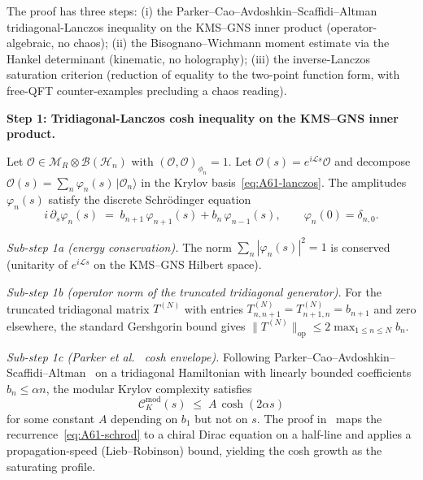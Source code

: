 \documentclass[12pt,a4paper]{article}
\begin{document}
The proof has three steps: (i) the Parker--Cao--Avdoshkin--Scaffidi--Altman
tridiagonal-Lanczos inequality on the KMS--GNS inner product (operator-algebraic,
no chaos); (ii) the Bisognano--Wichmann moment estimate via the Hankel
determinant (kinematic, no holography); (iii) the inverse-Lanczos
saturation criterion (reduction of equality to the two-point function form,
with free-QFT counter-examples precluding a chaos reading).

\medskip

\noindent\textbf{Step 1: Tridiagonal-Lanczos cosh inequality on the
KMS--GNS inner product.}

Let $\mathcal{O} \in \mathcal{M}_R \otimes \mathcal{B}(\mathcal{H}_n)$
with $(\mathcal{O},\mathcal{O})_{\phi_n} = 1$. Let
$\mathcal{O}(s) = e^{i\mathcal{L}s}\mathcal{O}$ and decompose
$\mathcal{O}(s) = \sum_n \varphi_n(s)\,|\mathcal{O}_n\rangle$
in the Krylov basis~\eqref{eq:A61-lanczos}.
The amplitudes $\varphi_n(s)$ satisfy the discrete Schr\"{o}dinger equation
\begin{equation}
  i\,\partial_s \varphi_n(s)
  \;=\;
  b_{n+1}\,\varphi_{n+1}(s) + b_n\,\varphi_{n-1}(s),
  \qquad
  \varphi_n(0) = \delta_{n,0}.
  \label{eq:A61-schrod}
\end{equation}

\emph{Sub-step 1a (energy conservation).} The norm
$\sum_n |\varphi_n(s)|^2 = 1$ is conserved (unitarity of $e^{i\mathcal{L}s}$
on the KMS--GNS Hilbert space).

\emph{Sub-step 1b (operator norm of the truncated tridiagonal generator).}
For the truncated tridiagonal matrix $T^{(N)}$ with entries
$T^{(N)}_{n,n+1} = T^{(N)}_{n+1,n} = b_{n+1}$ and zero elsewhere,
the standard Gershgorin bound gives
$\|T^{(N)}\|_{\mathrm{op}} \le 2 \max_{1\le n\le N} b_n$.

\emph{Sub-step 1c (Parker et al.~\cite{Parker2019} cosh envelope).}
Following Parker--Cao--Avdoshkin--Scaffidi--Altman~\cite{Parker2019}
on a tridiagonal Hamiltonian with linearly bounded coefficients
$b_n \le \alpha n$, the modular Krylov complexity satisfies
\begin{equation}
  \mathcal{C}_K^{\mathrm{mod}}(s)
  \;\le\;
  A\,\cosh(2\alpha s)
  \label{eq:A61-parker-cosh}
\end{equation}
for some constant $A$ depending on $b_1$ but not on $s$.
The proof in~\cite{Parker2019} maps the recurrence~\eqref{eq:A61-schrod}
to a chiral Dirac equation on a half-line and applies a
propagation-speed (Lieb--Robinson) bound, yielding the cosh growth as
the saturating profile.
\end{document}
